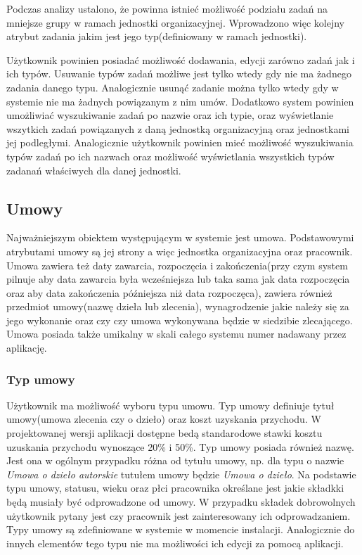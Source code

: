 Podczas analizy ustalono, że powinna istnieć możliwość podziału zadań na mniejsze grupy w ramach jednostki organizacyjnej. Wprowadzono więc kolejny atrybut zadania jakim jest jego typ(definiowany w ramach jednostki). 

Użytkownik powinien posiadać możliwość dodawania, edycji zarówno zadań jak i ich typów. Usuwanie typów zadań możliwe jest tylko wtedy gdy nie ma żadnego zadania danego typu. Analogicznie usunąć zadanie można tylko wtedy gdy w systemie nie ma żadnych powiązanym z nim umów. Dodatkowo system powinien umożliwiać wyszukiwanie zadań po nazwie oraz ich typie, oraz wyświetlanie wszytkich zadań powiązanych z daną jednostką organizacyjną oraz jednostkami jej podległymi. Analogicznie użytkownik powinien mieć możliwość wyszukiwania typów zadań po ich nazwach oraz możliwość wyświetlania wszystkich typów zadanań właściwych dla danej jednostki.

\subsection[Umowy][Umowy]{Umowy}
Najważniejszym obiektem występującym w systemie jest umowa. Podstawowymi atrybutami umowy są jej strony a więc jednostka organizacyjna oraz pracownik. Umowa zawiera też daty zawarcia, rozpoczęcia i zakończenia(przy czym system pilnuje aby data zawarcia była wcześniejsza lub taka sama jak data rozpoczęcia oraz aby data zakończenia późniejsza niż data rozpoczęca), zawiera również przedmiot umowy(nazwę dzieła lub zlecenia), wynagrodzenie jakie należy się za jego wykonanie oraz czy czy umowa wykonywana będzie w siedzibie zlecającego. Umowa posiada także umikalny w skali całego systemu numer nadawany przez aplikację.

\subsubsection{Typ umowy}
Użytkownik ma możliwość wyboru typu umowu. Typ umowy definiuje tytuł umowy(umowa zlecenia czy o dzieło) oraz koszt uzyskania przychodu. W projektowanej wersji aplikacji dostępne bedą standarodowe stawki kosztu uzuskania przychodu wynoszące 20\% i 50\%. Typ umowy posiada również nazwę. Jest ona w ogólnym przypadku różna od tytułu umowy, np. dla typu o nazwie \textit{Umowa o dzieło autorskie} tutułem umowy będzie \textit{Umowa o dzieło}. Na podstawie typu umowy, statusu, wieku oraz płci pracownika określane jest jakie składkki będą musiały być odprowadzone od umowy. W przypadku składek dobrowolnych użytkownik pytany jest czy pracownik jest zainteresowany ich odprowadzaniem. Typy umowy są zdefiniowane w systemie w momencie instalacji. Analogicznie do innych elementów tego typu nie ma możliwości ich edycji za pomocą aplikacji.

